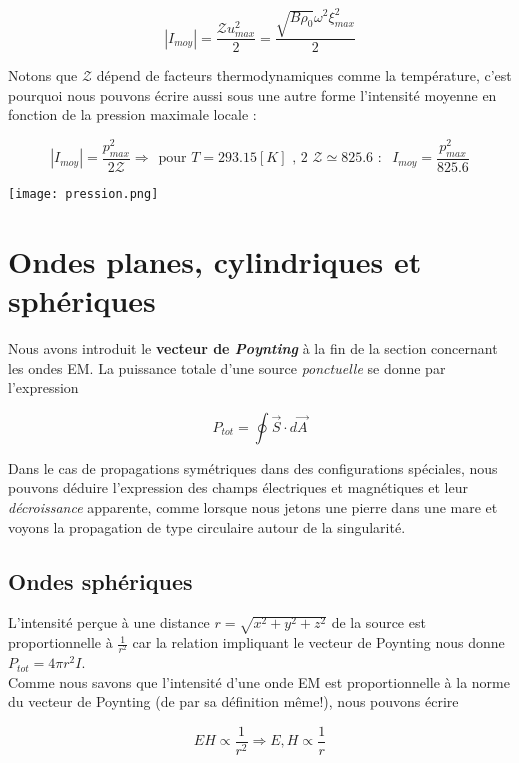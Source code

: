 \[ |I_{moy}| = \frac{\mathcal{Z} u^{2}_{max}}{2} = \frac{\sqrt{B \rho_{0}} \omega^{2} \xi_{max}^{2}}{2}\]

Notons que $\mathcal{Z}$ dépend de facteurs thermodynamiques comme la température, c'est pourquoi nous pouvons écrire aussi sous une autre forme l'intensité moyenne en fonction de
la pression maximale locale : 

\[ |I_{moy}| = \frac{p_{max}^{2}}{2 \mathcal{Z}} \Rightarrow \hspace{5pt} \mbox{pour $T = 293.15[K]$ , 2 $\mathcal{Z} \simeq 825.6$  : } \hspace{5pt} I_{moy} = \frac{p_{max}^{2}}{825.6}\]

\begin{center}
	\texttt{[image: pression.png]}
\end{center}

\section{Ondes planes, cylindriques et sphériques}

Nous avons introduit le \textbf{vecteur de \textit{Poynting}} à la fin de la section concernant les ondes EM. La puissance totale d'une source \textit{ponctuelle} se donne par l'expression 

\[P_{tot} = \oint \vec{S} \cdot d\vec{A}\]

Dans le cas de propagations symétriques dans des configurations spéciales, nous pouvons déduire l'expression des champs électriques et magnétiques et leur \textit{décroissance} apparente, comme 
lorsque nous jetons une pierre dans une mare et voyons la propagation de type circulaire autour de la singularité. 

\subsection{Ondes sphériques} 

L'intensité perçue à une distance $r = \sqrt{x^{2} + y^{2} + z^{2}}$ de la source est proportionnelle à $\frac{1}{r^{2}}$ car la relation impliquant le vecteur de Poynting nous 
donne $P_{tot} = 4 \pi r^{2} I$. \\ 
Comme nous savons que l'intensité d'une onde EM est proportionnelle à la norme du vecteur de Poynting (de par sa définition même!), nous pouvons écrire 

\[ EH \propto \frac{1}{r^{2}} \Rightarrow E,H \propto \frac{1}{r}\]

